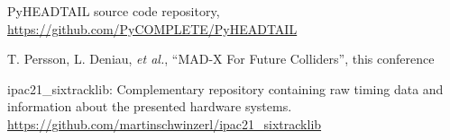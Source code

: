 \documentclass[a4paper,
               refpage,       %
               keeplastbox,   %
               ]{jacow}
\begin{document}
{\begin{thebibliography}{99}
        PyHEADTAIL source code repository,\newline
        \url{https://github.com/PyCOMPLETE/PyHEADTAIL}
        
        T. Persson, L. Deniau, {\it et al.}, ``MAD-X For Future Colliders'', this conference
        
        ipac21\_sixtracklib: Complementary repository containing raw timing data and
        information about the presented hardware systems.\newline 
        \url{https://github.com/martinschwinzerl/ipac21_sixtracklib}
	\end{thebibliography}
} %
%
% 

\end{document}
